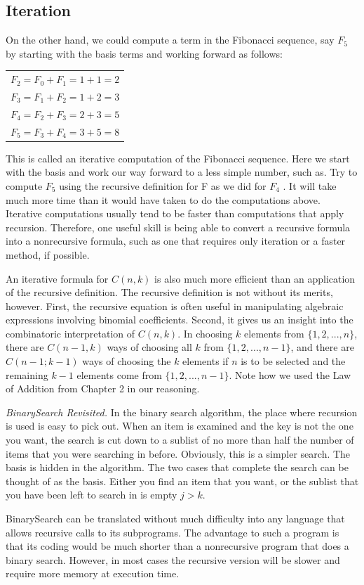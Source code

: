 \documentclass[10pt,]{book}
\theoremstyle{plain}
\theoremstyle{definition}
\theoremstyle{definition}
\theoremstyle{definition}
\theoremstyle{definition}
\numberwithin{equation}{section}
\begin{document}
\subsection[Iteration]{Iteration}\label{ss-iteration}
On the other hand, we could compute a term in the Fibonacci sequence, say \(F_5\) by starting with the basis terms and working forward as follows:%
\leavevmode%
\begin{table}
\centering
\begin{tabular}{l}
\(F_2= F_0+ F_1 =1 + 1 =2\)\tabularnewline[0pt]
\(F_3= F_1+ F_2=1+ 2=3\)\tabularnewline[0pt]
\(F_4= F_2+F_3=2+3=5\)\tabularnewline[0pt]
\(F_5=F_3+F_4= 3+5=8\)
\end{tabular}
\end{table}
\par
This is called an iterative computation of the Fibonacci sequence. Here we start with the basis and work our way forward to a less simple number,
such as. Try to compute \(F_5\) using the recursive definition for F as we did for \(F_4\) . It will take much more time than it would have taken to do the computations above. Iterative computations usually tend to be faster than computations that apply recursion. Therefore, one useful skill is being able to convert a recursive formula into a nonrecursive formula, such as one that requires only iteration or a faster method, if possible.%
\par
An iterative formula for \(C(n, k)\) is also much more efficient than an application of the recursive definition. The recursive definition is not
without its merits, however. First, the recursive equation is often useful in manipulating algebraic expressions involving binomial
coefficients. Second, it gives us an insight into the combinatoric interpretation of \(C(n, k)\). In choosing \(k\) elements from \(\{1, 2,
. . . , n\}\), there are \(C(n - 1, k)\) ways of choosing all \(k\) from \(\{1,2, . . . ,n - 1\}\), and there are \(C(n -1;k-1)\) ways of choosing
the \(k\) elements if \(n\) is to be selected and the remaining \(k - 1\) elements come from \(\{1, 2, . . . , n - 1\}\). Note how we
used the Law of Addition from Chapter 2 in our reasoning.%
\par
\emph{BinarySearch Revisited.} In the binary search algorithm, the place where recursion is used is easy to pick out. When an item is examined and
the key is not the one you want, the search is cut down to a sublist of no more than half the number of items that you were searching in before.
Obviously, this is a simpler search. The basis is hidden in the algorithm. The two cases that complete the search can be thought of as the basis.
Either you find an item that you want, or the sublist that you have been left to search in is empty \(j > k\).%
\par
BinarySearch can be translated without much difficulty into any language that allows recursive calls to its subprograms. The advantage to such a program is that its coding would be much shorter than a nonrecursive program that does a binary search. However, in most cases the recursive version will be slower and require more memory at execution time.%
\typeout{************************************************}
\typeout{************************************************}
\end{document}

